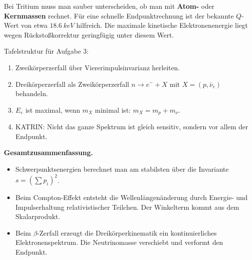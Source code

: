 \documentclass[11pt,a4paper]{scrartcl}
\theoremstyle{definition}
\theoremstyle{plain}
\theoremstyle{remark}
\begin{document}
\begin{warningbox}
Bei Tritium muss man sauber unterscheiden, ob man mit \textbf{Atom-} oder \textbf{Kernmassen} rechnet. Für eine schnelle Endpunktrechnung ist der bekannte $Q$-Wert von etwa $\SI{18.6}{keV}$ hilfreich. Die maximale kinetische Elektronenenergie liegt wegen Rückstoßkorrektur geringfügig unter diesem Wert.
\end{warningbox}

\begin{talkbox}
Tafelstruktur für Aufgabe 3:
\begin{enumerate}[label=\arabic*.]
    \item Zweikörperzerfall über Viererimpulsinvarianz herleiten.
    \item Dreikörperzerfall als Zweikörperzerfall $n\to e^-+X$ mit $X=(p,\bar\nu_e)$ behandeln.
    \item $E_e$ ist maximal, wenn $m_X$ minimal ist: $m_X=m_p+m_\nu$.
    \item KATRIN: Nicht das ganze Spektrum ist gleich sensitiv, sondern vor allem der Endpunkt.
\end{enumerate}
\end{talkbox}

\begin{summarybox}
\textbf{Gesamtzusammenfassung.}
\begin{itemize}
    \item Schwerpunktsenergien berechnet man am stabilsten über die Invariante $s=(\sum p_i)^2$.
    \item Beim Compton-Effekt entsteht die Wellenlängenänderung durch Energie- und Impulserhaltung relativistischer Teilchen. Der Winkelterm kommt aus dem Skalarprodukt.
    \item Beim $\beta$-Zerfall erzeugt die Dreikörperkinematik ein kontinuierliches Elektronenspektrum. Die Neutrinomasse verschiebt und verformt den Endpunkt.
\end{itemize}
\end{summarybox}
\end{document}
